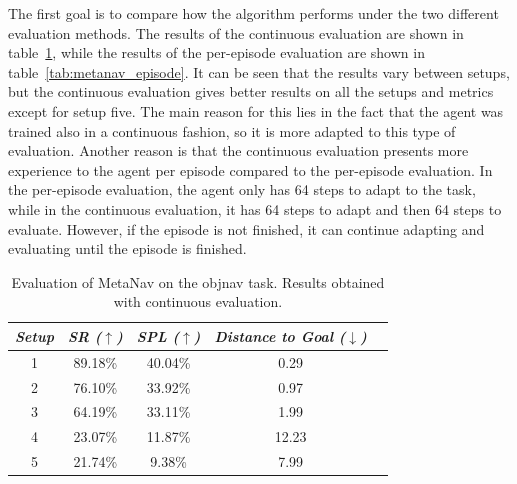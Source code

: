 The first goal is to compare how the algorithm performs under the two different evaluation methods.
The results of the continuous evaluation are shown in table~\ref{tab:metanav_continuos}, while the results of the per-episode evaluation are shown in table~\ref{tab:metanav_episode}.
It can be seen that the results vary between setups, but the continuous evaluation gives better results on all the setups and metrics except for setup five.
The main reason for this lies in the fact that the agent was trained also in a continuous fashion, so it is more adapted to this type of evaluation.
Another reason is that the continuous evaluation presents more experience to the agent per episode compared to the per-episode evaluation.
In the per-episode evaluation, the agent only has 64 steps to adapt to the task, while in the continuous evaluation, it has 64 steps to adapt and then 64 steps to evaluate.
However, if the episode is not finished, it can continue adapting and evaluating until the episode is finished.

\begin{table}
    \centering
    \begin{tabular}{c|cccc}
        \toprule
        \textit{\textbf{Setup}} & \textit{\textbf{SR ($\uparrow$)}} & \textbf{\textit{SPL ($\uparrow$)}} & \textit{\textbf{Distance to Goal ($\downarrow$)}} \\ \midrule
        1                       & 89.18\%                           & 40.04\%                            & 0.29                                              \\
        2                       & 76.10\%                           & 33.92\%                            & 0.97                                              \\
        3                       & 64.19\%                           & 33.11\%                            & 1.99                                              \\
        4                       & 23.07\%                           & 11.87\%                            & 12.23                                             \\
        5                       & 21.74\%                           & 9.38\%                             & 7.99                                              \\
    \end{tabular}
    \caption{Evaluation of MetaNav on the \acrshort{objnav} task.
    Results obtained with continuous evaluation.}
    \label{tab:metanav_continuos}
\end{table}


